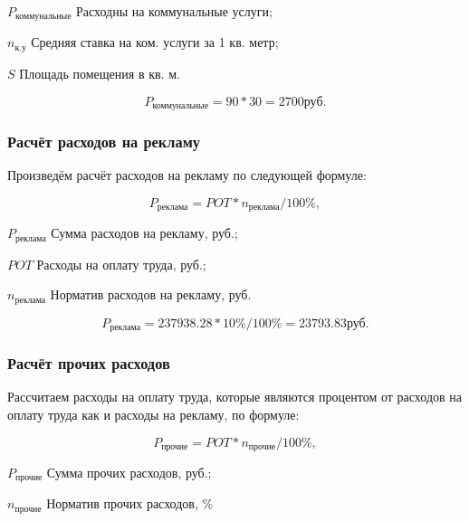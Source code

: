 \begin{eqexpl}[25mm]
    \item{$P_\text{коммунальные}$} Расходны на коммунальные услуги;
    \item{$n_\text{к.у}$} Средняя ставка на ком. услуги за 1 кв. метр;
    \item{$S$} Площадь помещения в кв. м.
\end{eqexpl}

\begin{equation*}
    P_\text{коммунальные} = 90 * 30 = 2700 \text{руб}.
\end{equation*}

\subsubsection{Расчёт расходов на рекламу}

Произведём расчёт расходов на рекламу по следующей формуле:

\begin{equation}
    P_\text{реклама} = POT * n_\text{реклама} / 100\%,
\end{equation}

\begin{eqexpl}[25mm]
    \item{$P_\text{реклама}$} Сумма расходов на рекламу, руб.;
    \item{$POT$} Расходы на оплату труда, руб.;
    \item{$n_\text{реклама}$} Норматив расходов на рекламу, руб.
\end{eqexpl}

\begin{equation*}
    P_\text{реклама} = 237938.28 * 10\% / 100\% = 23793.83 \text{руб}.
\end{equation*}

\subsubsection{Расчёт прочих расходов}

Рассчитаем расходы на оплату труда, которые являются процентом от расходов
на оплату труда как и расходы на рекламу, по формуле:

\begin{equation}
    P_\text{прочие} = POT * n_\text{прочие} / 100\%,
\end{equation}

\begin{eqexpl}[25mm]
    \item{$P_\text{прочие}$} Сумма прочих расходов, руб.;
    \item{$n_\text{прочие}$} Норматив прочих расходов, \%
\end{eqexpl}

